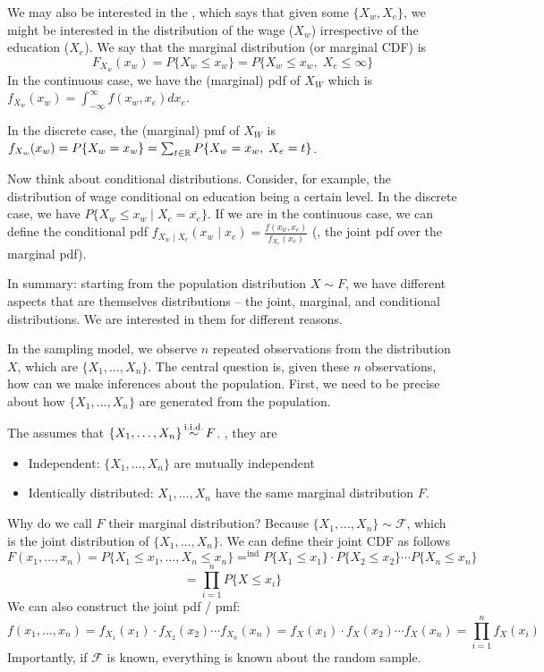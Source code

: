 \documentclass[10pt]{article}
\begin{document}
We may also be interested in the , which says that given some $\{X_w,X_e\}$, we might be interested in the distribution of the wage ($X_w$) irrespective of the education ($X_e$). We say that the marginal distribution (or marginal CDF) is
\[
F_{X_w}(x_w) = P\{X_w \le x_w\} = P\{X_w \le x_w,\; X_e \le \infty\}
\]
In the continuous case, we have the (marginal) pdf of $X_W$ which is $f_{X_w}(x_w)= \int_{-\infty}^\infty f(x_w,x_e) dx_e$.

In the discrete case, the (marginal) pmf of $X_W$ is $f_{X_w}(x_w) = P\{X_w = x_w\} = \sum_{t \in \mathbb{R}} P\{X_w = x_w,\; X_e = t\}$.

Now think about conditional distributions. Consider, for example, the distribution of wage conditional on education being a certain level. In the discrete case, we have $P\{X_w \le x_w \mid X_e = \overline{x_e}\}$. If we are in the continuous case, we can define the conditional pdf $f_{X_w \mid X_e}(x_w \mid x_e) = \frac{f(x_w,x_e)}{f_{X_e}(x_e)}$ (\ie, the joint pdf over the marginal pdf).

In summary: starting from the population distribution $X \sim F$, we have different aspects that are themselves distributions -- the joint, marginal, and conditional distributions. We are interested in them for different reasons.

In the sampling model, we observe $n$ repeated observations from the distribution $X$, which are $\{X_1,\dots,X_n\}$. The central question is, given these $n$ observations, how can we make inferences about the population. First, we need to be precise about how $\{X_1,\dots,X_n\}$ are generated from the population.

\begin{definition}
	The  assumes that $\{X_1,\dots,X_n\} \mathop{\overset{\text{i.i.d.}}\sim} F$. \ie, they are
	\begin{itemize}
		\item Independent: $\{X_1,\dots,X_n\}$ are mutually independent
		\item Identically distributed: $X_1,\dots,X_n$ have the same marginal distribution $F$.
	\end{itemize}
\end{definition}

Why do we call $F$ their marginal distribution? Because $\{X_1,\dots,X_n\} \sim \mathcal{F}$, which is the joint distribution of $\{X_1,\dots,X_n\}$. We can define their joint CDF as follows
\[
F(x_1,\dots,x_n) = P\{X_1 \le x_1,\dots,X_n \le x_n\} =^{\text{ind}} P\{X_1 \le x_1\} \cdot P\{X_2 \le x_2\} \cdots P\{X_n \le x_n\}  
\]
\[
= \prod_{i=1}^n P\{X \le x_i\}
\]
We can also construct the joint pdf / pmf:
\[
f(x_1,\dots,x_n) = f_{X_1}(x_1) \cdot f_{X_2}(x_2) \cdots f_{X_n}(x_n) = f_X(x_1) \cdot f_X(x_2) \cdots f_X(x_n) = \prod_{i=1}^n f_X(x_i)
\]
Importantly, if $\mathcal{F}$ is known, everything is known about the random sample.
\end{document}
